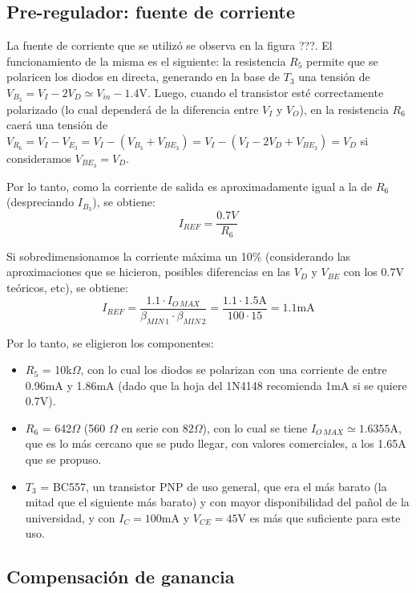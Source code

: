\documentclass[e2_tp1_main.tex]{subfiles}
\begin{document}
\subsection{Pre-regulador: fuente de corriente}

La fuente de corriente que se utiliz\'o se observa en la figura ???. El funcionamiento de la misma es el siguiente: la resistencia $R_5$ permite que se polaricen los diodos en directa, generando en la base de $T_3$ una tensi\'on de $V_{B_3}=V_{I} - 2 V_D \simeq V_{in} - 1.4\mathrm{V}$. Luego, cuando el transistor est\'e correctamente polarizado (lo cual depender\'a de la diferencia entre $V_I$ y $V_O$), en la resistencia $R_6$ caer\'a una tensi\'on de $V_{R_6} = V_I - V_{E_3} = V_I - (V_{B_3} + V_{BE_3}) = V_I - (V_I - 2V_D + V_{BE_3}) = V_D$ si consideramos $V_{BE_3} = V_D$.

Por lo tanto, como la corriente de salida es aproximadamente igual a la de $R_6$ (despreciando $I_{B_3}$), se obtiene:
\begin{equation}
	I_{REF} = \frac{0.7V}{R_6}
\end{equation}

Si sobredimensionamos la corriente m\'axima un 10\% (considerando las aproximaciones que se hicieron, posibles diferencias en las $V_D$ y $V_{BE}$ con los 0.7V te\'oricos, etc), se obtiene:
\[
	I_{REF} =
	 \frac{1.1 \cdot I_{O\, MAX}}
	 {\beta_{MIN\, 1} \cdot \beta_{MIN\, 2}}		
	 = \frac{1.1 \cdot 1.5\mathrm{A}}{100 \cdot 15}
	=1.1\text{mA}
\]

Por lo tanto, se eligieron los componentes:

\begin{itemize}
	\item $R_5$ = 10k$\Omega$, con lo cual los diodos se polarizan con una corriente de entre 0.96mA y 1.86mA (dado que la hoja del 1N4148 recomienda 1mA si se quiere 0.7V).
	\item $R_6$ = 642$\Omega$ (560 $\Omega$ en serie con $82\Omega$), con lo cual se tiene $I_{O\, MAX} \simeq 1.6355$A, que es lo m\'as cercano que se pudo llegar, con valores comerciales, a los 1.65A que se propuso.
	\item $T_3$ = BC557, un transistor PNP de uso general, que era el m\'as barato (la mitad que el siguiente m\'as barato) y con mayor disponibilidad del pa\~nol de la universidad, y con $I_C = 100$mA y $V_{CE}=45$V es m\'as que suficiente para este uso.
\end{itemize}






\subsection{Compensaci\'on de ganancia}
\end{document}
